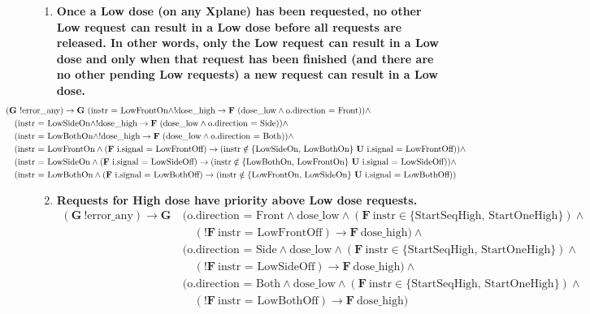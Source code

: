 \documentclass[a4paper,10pt]{article}
\newcommand{\LTLG}{\mathbf{G~}}
\newcommand{\LTLF}{\mathbf{F~}}
\newcommand{\LTLU}{\mathbf{~U~}}
\newcommand{\imply}{\rightarrow}
\newcommand{\doselow}{\textrm{dose\_low}}
\newcommand{\dosehigh}{\textrm{dose\_high}}
\newcommand{\errorany}{\textrm{error\_any}}
\begin{document}
\begin{enumerate}
		\item \textbf{Once a Low dose (on any Xplane) has been requested, no other Low request can result in a Low dose before all requests are released. In other words, only the Low request can result in a Low dose and only when that request has been finished (and there are no other pending Low requests) a new request can result in a Low dose.}
			\begin{align*}
				&\hspace{-6em}(\LTLG !\errorany) \imply \LTLG (\textrm{instr = LowFrontOn} \land !\dosehigh \imply \LTLF (\doselow \land \textrm{o.direction = Front})) \land \\
				&	\hspace{-5em}(\textrm{instr = LowSideOn} \land !\dosehigh \imply \LTLF (\doselow \land \textrm{o.direction = Side})) \land \\
				&	\hspace{-5em}(\textrm{instr = LowBothOn} \land !\dosehigh \imply \LTLF (\doselow \land \textrm{o.direction = Both})) \land \\
				&	\hspace{-5em}(\textrm{instr = LowFrontOn} \land (\LTLF \textrm{i.signal = LowFrontOff}) \imply (\textrm{instr} \notin \{\textrm{LowSideOn, LowBothOn}\} \LTLU \textrm{i.signal = LowFrontOff})) \land \\
				&	\hspace{-5em}(\textrm{instr = LowSideOn} \land (\LTLF \textrm{i.signal = LowSideOff}) \imply (\textrm{instr} \notin \{\textrm{LowBothOn, LowFrontOn}\} \LTLU \textrm{i.signal = LowSideOff})) \land \\
				&	\hspace{-5em}(\textrm{instr = LowBothOn} \land (\LTLF \textrm{i.signal = LowBothOff}) \imply (\textrm{instr} \notin \{\textrm{LowFrontOn, LowSideOn}\} \LTLU \textrm{i.signal = LowBothOff}))
			\end{align*}

		\item \textbf{Requests for High dose have priority above Low dose requests.}
			\begin{align*}
				(\LTLG !\errorany) \imply \LTLG &(\textrm{o.direction = Front} \land \doselow \land (\LTLF \textrm{instr} \in \{\textrm{StartSeqHigh, StartOneHigh}\}) \land \\
					&	\hspace{1em}(!\LTLF \textrm{instr = LowFrontOff}) \imply \LTLF \dosehigh) \land \\
					&(\textrm{o.direction = Side} \land \doselow \land (\LTLF \textrm{instr} \in \{\textrm{StartSeqHigh, StartOneHigh}\}) \land \\
					&	\hspace{1em}(!\LTLF \textrm{instr = LowSideOff}) \imply \LTLF \dosehigh) \land \\
					&(\textrm{o.direction = Both} \land \doselow \land (\LTLF \textrm{instr} \in \{\textrm{StartSeqHigh, StartOneHigh}\}) \land \\
					&	\hspace{1em}(!\LTLF \textrm{instr = LowBothOff}) \imply \LTLF \dosehigh)
			\end{align*}


\end{enumerate}
\end{document}
